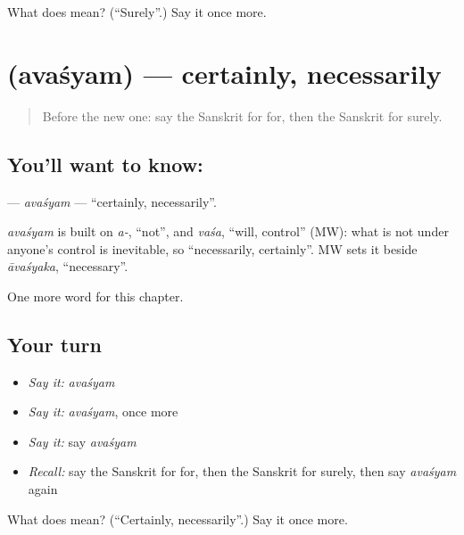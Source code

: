 \begin{tcolorbox}[breakable,colback=teal!4,colframe=teal!35!black,title={Before you move on}]
What does  mean? (\textquotedblleft{}Surely\textquotedblright{}.) Say it once more.
\end{tcolorbox}
\section[\texorpdfstring{\sk{अवश्यम्} (avaśyam)}{अवश्यम् (avaśyam)}]{ (avaśyam) — certainly, necessarily}

\label{lesson:SA-C185-avasyam}



\begin{quote}
Before the new one: say the Sanskrit for for, then the Sanskrit for surely.
\end{quote}

\subsection*{You'll want to know: }
\textbf{} — \emph{avaśyam} — \textquotedblleft{}certainly, necessarily\textquotedblright{}.

\begin{cousinweb}
\emph{avaśyam} is built on \emph{a-}, \textquotedblleft{}not\textquotedblright{}, and \emph{vaśa}, \textquotedblleft{}will, control\textquotedblright{} (MW): what is not under anyone's control is inevitable, so \textquotedblleft{}necessarily, certainly\textquotedblright{}. MW sets it beside \emph{āvaśyaka}, \textquotedblleft{}necessary\textquotedblright{}.
\end{cousinweb}

\begin{grammarlens}[title={What you've built}]
One more word for this chapter.
\end{grammarlens}

\subsection*{Your turn}
\begin{itemize}
\raggedright
  \item \emph{Say it:} \emph{avaśyam}
  \item \emph{Say it:} \emph{avaśyam}, once more
  \item \emph{Say it:} say \emph{avaśyam}
  \item \emph{Recall:} say the Sanskrit for for, then the Sanskrit for surely, then say \emph{avaśyam} again
\end{itemize}

\begin{tcolorbox}[breakable,colback=teal!4,colframe=teal!35!black,title={Before you move on}]
What does  mean? (\textquotedblleft{}Certainly, necessarily\textquotedblright{}.) Say it once more.
\end{tcolorbox}
